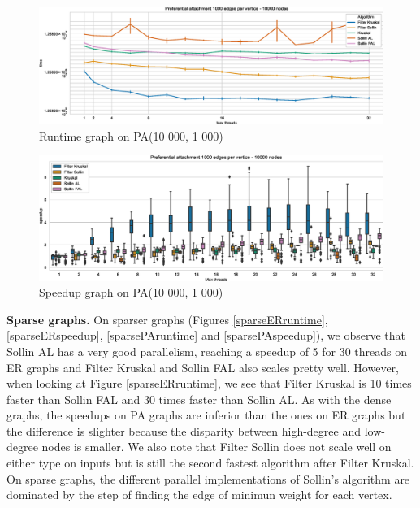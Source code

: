 \documentclass[letterpaper]{article}
\newcommand{\mypar}[1]{{\bf #1.}}
\begin{document}
\begin{figure}\centering
  \includegraphics[width=\linewidth]{graphics/Graph_runtime_Preferential_attachment_1000_edges_per_vertice_10000.eps}
  \caption{Runtime graph on PA(10 000, 1 000)\label{densePAruntime}}
\end{figure}

\begin{figure}\centering
  \includegraphics[width=\linewidth]{graphics/Box_Speedup_Preferential_attachment_1000_edges_per_vertice_10000.eps}
  \caption{Speedup graph on PA(10 000, 1 000)\label{densePAspeedup}}
\end{figure}



\mypar{Sparse graphs} On sparser graphs (Figures \ref{sparseERruntime}, \ref{sparseERspeedup}, \ref{sparsePAruntime} and \ref{sparsePAspeedup}), we observe that Sollin AL has a very good parallelism, reaching a speedup of 5 for 30 threads on ER graphs and Filter Kruskal and Sollin FAL also scales pretty well. However, when looking at Figure \ref{sparseERruntime}, we see that Filter Kruskal is 10 times faster than Sollin FAL and 30 times faster than Sollin AL. As with the dense graphs, the speedups on PA graphs are inferior than the ones on ER graphs but the difference is slighter because the disparity between high-degree and low-degree nodes is smaller. We also note that Filter Sollin does not scale well on either type on inputs but is still the second fastest algorithm after Filter Kruskal. On sparse graphs, the different parallel implementations of Sollin's algorithm are dominated by the step of finding the edge of minimun weight for each vertex.
\end{document}
